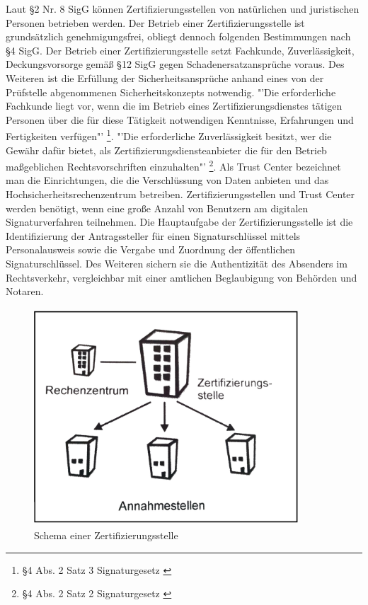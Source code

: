 Laut \S 2 Nr. 8 SigG können Zertifizierungsstellen von natürlichen und juristischen Personen betrieben werden. Der Betrieb einer Zertifizierungsstelle ist grundsätzlich genehmigungsfrei, obliegt dennoch folgenden Bestimmungen nach \S 4 SigG. Der Betrieb einer Zertifizierungsstelle setzt Fachkunde, Zuverlässigkeit, Deckungsvorsorge gemäß \S 12 SigG gegen Schadenersatzansprüche voraus. Des Weiteren ist die Erfüllung der Sicherheitsansprüche anhand eines von der Prüfstelle abgenommenen Sicherheitskonzepts notwendig. "'Die erforderliche Fachkunde liegt vor, wenn die im Betrieb eines Zertifizierungsdienstes tätigen Personen über die für diese Tätigkeit notwendigen Kenntnisse, Erfahrungen und Fertigkeiten verfügen"' \footnote{\S 4 Abs. 2 Satz 3 Signaturgesetz \cite{grundlagenFN2}}. "'Die erforderliche Zuverlässigkeit besitzt, wer die Gewähr dafür bietet, als Zertifizierungsdiensteanbieter die für den Betrieb maßgeblichen Rechtsvorschriften einzuhalten"' \footnote{\S 4 Abs. 2 Satz 2 Signaturgesetz \cite{grundlagenFN2}}. Als Trust Center bezeichnet man die Einrichtungen, die die Verschlüssung von Daten anbieten und das Hochsicherheitsrechenzentrum betreiben. Zertifizierungsstellen und Trust Center werden benötigt, wenn eine große Anzahl von Benutzern am digitalen Signaturverfahren teilnehmen. Die Hauptaufgabe der Zertifizierungsstelle ist die Identifizierung der Antragssteller für einen Signaturschlüssel mittels Personalausweis sowie die Vergabe und Zuordnung der öffentlichen Signaturschlüssel. Des Weiteren sichern sie die Authentizität des Absenders im Rechtsverkehr, vergleichbar mit einer amtlichen Beglaubigung von Behörden und Notaren. \cite{standdeswissens3}\cite{zertstelle1} 
\begin{figure}[!ht]
    \centering
    \includegraphics[height=230pt, width=280pt]{trustcenterNeu3.jpg}
    \caption[Schema einer Zertifizierungsstelle]{\small{Schema einer Zertifizierungsstelle \cite{trust1}}}
\end{figure}
